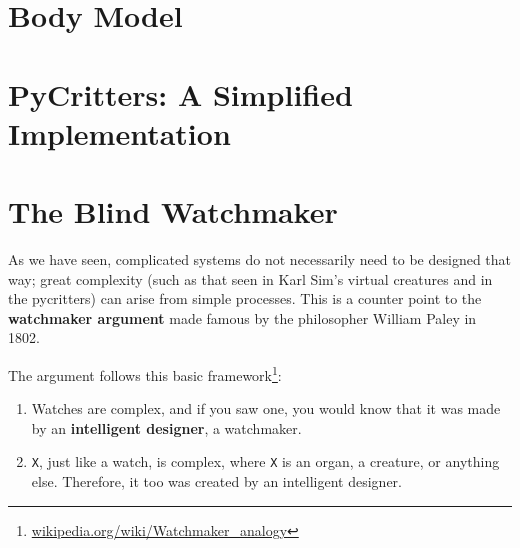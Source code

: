 


\section{Body Model}



\section{PyCritters: A Simplified Implementation}


\section{The Blind Watchmaker}


As we have seen, complicated systems do not necessarily need to be designed that
way; great complexity (such as that seen in Karl Sim's virtual creatures and in the pycritters) 
can arise from simple processes. This is a counter point to the {\bf watchmaker
argument} made famous by the philosopher William Paley in 1802. 

The argument follows this basic
framework\footnote{\url{wikipedia.org/wiki/Watchmaker_analogy}}:

\begin{enumerate}
  \item Watches are complex, and if you saw one, you would know that it was made
  by an {\bf intelligent designer}, a watchmaker.

  \item {\tt X}, just like a watch, is complex, where {\tt X} is an organ, a
  creature, or anything else. Therefore, it too was created by
  an intelligent designer.
\end{enumerate}

